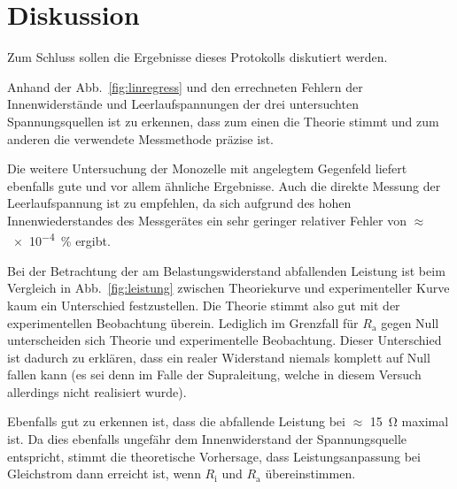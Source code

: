 
\section{Diskussion}
Zum Schluss sollen die Ergebnisse dieses Protokolls diskutiert werden.

Anhand der Abb.~\ref{fig:linregress} und den errechneten Fehlern der
Innenwiderstände und Leerlaufspannungen der drei untersuchten
Spannungsquellen ist zu erkennen, dass zum einen die Theorie stimmt
und zum anderen die verwendete Messmethode präzise ist.

Die weitere Untersuchung der Monozelle mit angelegtem Gegenfeld liefert 
ebenfalls gute und vor allem ähnliche Ergebnisse. 
Auch die direkte Messung der Leerlaufspannung ist zu empfehlen, da 
sich aufgrund des hohen Innenwiederstandes des Messgerätes ein
sehr geringer relativer Fehler von $\approx$ \SI{e-4}{\percent} 
ergibt.

Bei der Betrachtung der am Belastungswiderstand abfallenden Leistung 
ist beim Vergleich in Abb.~\ref{fig:leistung} zwischen Theoriekurve und 
experimenteller Kurve kaum ein Unterschied festzustellen. Die Theorie 
stimmt also gut mit der experimentellen Beobachtung überein. Lediglich 
im Grenzfall für $R_\text{a}$ gegen Null unterscheiden sich Theorie und 
experimentelle Beobachtung. Dieser Unterschied ist dadurch zu erklären, 
dass ein realer Widerstand niemals komplett auf Null fallen kann (es sei 
denn im Falle der Supraleitung, welche in diesem Versuch allerdings nicht 
realisiert wurde).

Ebenfalls gut zu erkennen ist, dass die abfallende Leistung bei $\approx$ 
\SI{15}{\ohm} maximal ist. Da dies ebenfalls ungefähr dem Innenwiderstand 
der Spannungsquelle entspricht, stimmt die theoretische Vorhersage, dass 
Leistungsanpassung bei Gleichstrom dann erreicht ist, wenn $R_\text{i}$ 
und $R_\text{a}$ übereinstimmen.
